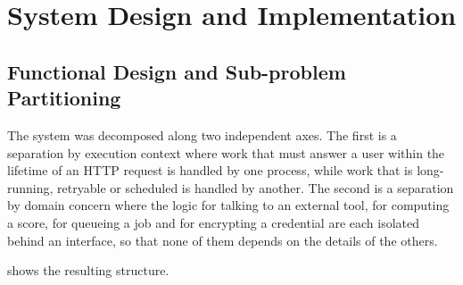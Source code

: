 \chapter{System Design and Implementation}
\label{ch:design}


\section{Functional Design and Sub-problem Partitioning}
\label{sec:architecture}

The system was decomposed along two independent axes. The first is a separation
by execution context where work that must answer a user within the lifetime of
an HTTP request is handled by one process, while work that is long-running,
retryable or scheduled is handled by another. The second is a separation by
domain concern where the logic for talking to an external tool, for computing a
score, for queueing a job and for encrypting a credential are each isolated
behind an interface, so that none of them depends on the details of the others.

 shows the resulting structure.

